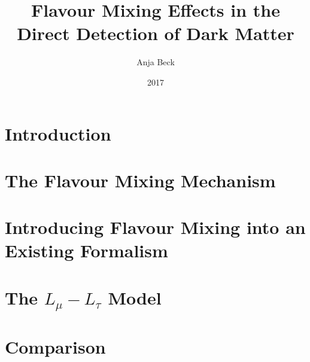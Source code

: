 \documentclass[
  tucolor,
  BCOR=12mm,     %
  parskip=half,  %
  open=any,      %
  cleardoublepage=plain,  %
]{tudothesis}
\author{Anja Beck}
\title{Flavour Mixing Effects in the Direct Detection of Dark Matter}
\date{2017}
\begin{document}
\frontmatter
%
\maketitle

\makecorrectorpage


\cleardoublepage
\tableofcontents

\mainmatter
\chapter{Introduction}

\chapter{The Flavour Mixing Mechanism}

\chapter{Introducing Flavour Mixing into an Existing Formalism\label{sec:formalism}}

\chapter{The \texorpdfstring{$L_\mu-L_\tau$}{TEXT} Model\label{sec:NewInt}}

\chapter{Comparison}

%

\appendix

\todos
\cleardoublepage
\backmatter
\printbibliography

\cleardoublepage

\end{document}

